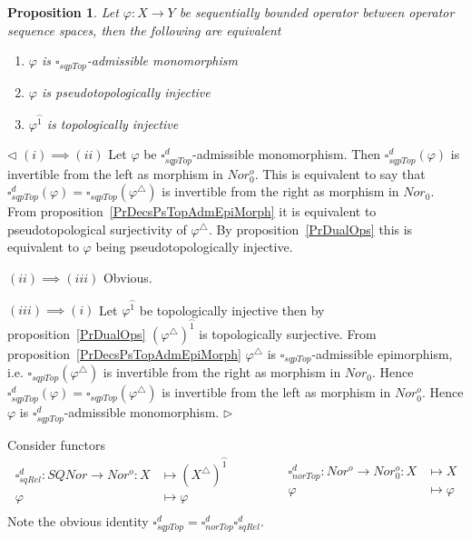 \documentclass[12pt]{article}
\newtheorem{proposition}[theorem]{Proposition}
\newenvironment{proof}{\par $\triangleleft$}{$\triangleright$}
\begin{document}
\begin{proposition}\label{PrDecsPsTopAdmMonoMorph}
Let $\varphi:X\to Y$ be sequentially bounded operator between operator 
sequence spaces, then the following are equivalent
\begin{enumerate}[label = (\roman*)]
    \item $\varphi$ is $\square_{sqpTop}$-admissible monomorphism

    \item $\varphi$ is pseudotopologically injective

    \item $\varphi^{\wideparen{1}}$ is topologically injective
\end{enumerate}
\end{proposition}
\begin{proof}
$(i)\implies (ii)$ Let $\varphi$ 
be $\square_{sqpTop}^d$-admissible monomorphism. 
Then $\square_{sqpTop}^d(\varphi)$ is invertible from the left as morphism 
in $Nor_0^o$. This is equivalent to say that
$\square_{sqpTop}^d(\varphi)=\square_{sqpTop}(\varphi^\triangle)$ is invertible 
from the right as morphism in $Nor_0$. 
From proposition~\ref{PrDecsPsTopAdmEpiMorph} it is equivalent to 
pseudotopological surjectivity of $\varphi^\triangle$. 
By proposition~\ref{PrDualOps} this is equivalent to $\varphi$ being 
pseudotopologically injective.

$(ii)\implies (iii)$ Obvious.

$(iii)\implies (i)$ Let $\varphi^{\wideparen{1}}$ be topologically injective 
then by proposition~\ref{PrDualOps} ${(\varphi^\triangle)}^{\wideparen{1}}$ 
is topologically surjective. From proposition~\ref{PrDecsPsTopAdmEpiMorph} 
$\varphi^\triangle$ is $\square_{sqpTop}$-admissible epimorphism, 
i.e. $\square_{sqpTop}(\varphi^\triangle)$ is invertible from the right as 
morphism in $Nor_0$. Hence $\square_{sqpTop}^d(\varphi)
=\square_{sqpTop}(\varphi^\triangle)$ is invertible from the left as 
morphism in $Nor_0^o$. Hence $\varphi$  is $\square_{sqpTop}^d$-admissible 
monomorphism. 
\end{proof}

Consider functors
$$
\begin{aligned}
\square_{sqRel}^d : SQNor \to Nor^o: X &\mapsto{(X^\triangle)}^{\wideparen{1}}\\
\varphi&\mapsto\varphi \\
\end{aligned}
\qquad\qquad
\begin{aligned}
\square_{norTop}^d : Nor^o \to Nor_0^o: X &\mapsto X\\
\varphi&\mapsto\varphi \\
\end{aligned}
$$
Note the obvious identity 
$\square_{sqpTop}^d=\square_{norTop}^d\square_{sqRel}^d$.
\end{document}

